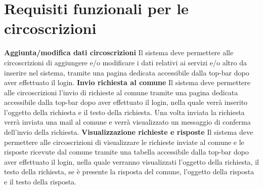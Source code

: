     \section{Requisiti funzionali per le circoscrizioni}
        \begin{rfList}
            \rfItem \textbf{Aggiunta/modifica dati circoscrizioni} Il sistema deve permettere alle circoscrizioni di aggiungere e/o modificare i dati relativi ai servizi e/o altro da inserire nel sistema, tramite una pagina dedicata accessibile dalla top-bar dopo aver effettuato il login.
            \rfItem \textbf{Invio richiesta al comune} Il sistema deve permettere alle circoscrizioni l'invio di richieste al comune tramite una pagina dedicata accessibile dalla top-bar dopo aver effettuato il login, nella quale verrà inserito l'oggetto della richiesta e il testo della richiesta. Una volta inviata la richiesta verrà inviata una mail al comune e verrà visualizzato un messaggio di conferma dell'invio della richiesta.
            \rfItem \textbf{Visualizzazione richieste e risposte} Il sistema deve permettere alle circoscrizioni di visualizzare le richieste inviate al comune e le risposte ricevute dal comune tramite una tabella accessibile dalla top-bar dopo aver effettuato il login, nella quale verranno visualizzati l'oggetto della richiesta, il testo della richiesta, se è presente la risposta del comune, l'oggetto della risposta e il testo della risposta.
        \end{rfList}